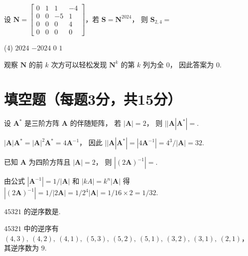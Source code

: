 \begin{problem}
  设 $\mathbf N =
  \begin{bmatrix} 
    0 & 1 & 1 & -4 \\ 
    0 & 0 & -5 & 1 \\ 
    0 & 0 & 0 & 4 \\ 
    0 & 0 & 0 & 0 
  \end{bmatrix}$，若 $\mathbf S = \mathbf N^{2024}$， 则 $\mathbf S_{2,4} = $
  \begin{tasks}(4)
    \task $2024$
    \task $-2024$
    \task[\true] $0$
    \task $1$
  \end{tasks}
\end{problem}
\scratch
\begin{solution}
  观察 $\mathbf N$ 的前 $k$ 次方可以轻松发现 $\mathbf N^k$ 的第 $k$ 列为全 $0$，
  因此答案为 $0$.
\end{solution}

\section{填空题（每题3分，共15分）}

\begin{problem}
  设 $\mathbf A^*$ 是三阶方阵 $\mathbf A$ 的伴随矩阵， 若 $|\mathbf A|=2$， 
  则 $||\mathbf A|\mathbf A^*| = $.
\end{problem}
\scratch[6ex]
\begin{solution}
  $|\mathbf A|\mathbf A^* = |\mathbf A|^2\mathbf A^* = 4\mathbf A^{-1}$，
  因此 $||\mathbf A|\mathbf A^*| = |4\mathbf A^{-1}| = 4^3/|\mathbf A| = 32$.
\end{solution}

\begin{problem}
  已知 $\mathbf A$ 为四阶方阵且 $|\mathbf A| = 2$，
  则 $|(2\mathbf A)^{-1}| = $.
\end{problem}
\scratch[6ex]
\begin{solution}
  由公式 $|\mathbf A^{-1}| = 1/|\mathbf A|$ 和 $|kA| = k^{n}|\mathbf A|$ 得
  $ |(2\mathbf A)^{-1}| = 1/|2\mathbf A| = 1/2^4|\mathbf A|
  = 1/16\times 2 = 1/32$.
\end{solution}

\begin{problem}
  $45321$ 的逆序数是.
\end{problem}
\scratch[6ex]
\begin{solution}
  $45321$ 中的逆序有
  $(4,3),~ (4,2),~ (4,1),~ (5,3),~ (5,2),~ (5,1),~ (3,2),~ (3,1),~ (2,1)$，
  其逆序数为 $9$.
\end{solution}

